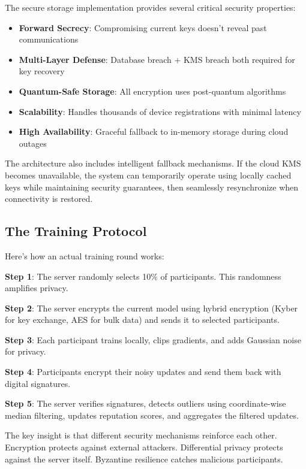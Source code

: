 \documentclass[onecolumn,11pt]{article}
\begin{document}
The secure storage implementation provides several critical security properties:

\begin{itemize}
\item \textbf{Forward Secrecy}: Compromising current keys doesn't reveal past communications
\item \textbf{Multi-Layer Defense}: Database breach + KMS breach both required for key recovery
\item \textbf{Quantum-Safe Storage}: All encryption uses post-quantum algorithms
\item \textbf{Scalability}: Handles thousands of device registrations with minimal latency
\item \textbf{High Availability}: Graceful fallback to in-memory storage during cloud outages
\end{itemize}

The architecture also includes intelligent fallback mechanisms. If the cloud KMS becomes unavailable, the system can temporarily operate using locally cached keys while maintaining security guarantees, then seamlessly resynchronize when connectivity is restored.

\subsection{The Training Protocol}

Here's how an actual training round works:

\textbf{Step 1}: The server randomly selects 10\% of participants. This randomness amplifies privacy.

\textbf{Step 2}: The server encrypts the current model using hybrid encryption (Kyber for key exchange, AES for bulk data) and sends it to selected participants.

\textbf{Step 3}: Each participant trains locally, clips gradients, and adds Gaussian noise for privacy.

\textbf{Step 4}: Participants encrypt their noisy updates and send them back with digital signatures.

\textbf{Step 5}: The server verifies signatures, detects outliers using coordinate-wise median filtering, updates reputation scores, and aggregates the filtered updates.

The key insight is that different security mechanisms reinforce each other. Encryption protects against external attackers. Differential privacy protects against the server itself. Byzantine resilience catches malicious participants.
\end{document}

